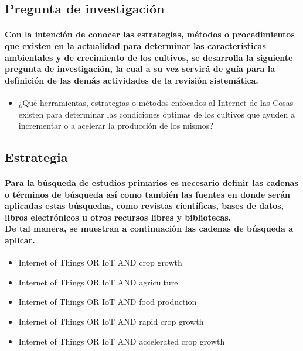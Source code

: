 \documentclass[10pt, twocolumn]{article}
\begin{document}
\subsection{Pregunta de investigación}
\paragraph{Con la intención de conocer las estrategias, métodos o procedimientos que existen en la actualidad para determinar las características ambientales y de crecimiento de los cultivos, se desarrolla la siguiente pregunta de investigación, la cual a su vez servirá de guía para la definición de las demás actividades de la revisión sistemática.}
\begin{itemize}
	\item{¿Qué herramientas, estrategias o métodos enfocados al Internet de las Cosas existen para determinar las condiciones óptimas de los cultivos que ayuden a incrementar o a acelerar la producción de los mismos?}
\end{itemize}

\subsection{Estrategia}
\paragraph{Para la búsqueda de estudios primarios es necesario definir las cadenas o términos de búsqueda así como también las fuentes en donde serán aplicadas estas búsquedas, como revistas científicas, bases de datos, libros electrónicos u otros recursos libres y bibliotecas. \\ De tal manera, se muestran a continuación las cadenas de búsqueda a aplicar.}
\begin{itemize}
	\item{Internet of Things OR IoT AND crop growth}
	\item{Internet of Things OR IoT AND agriculture}
	\item{Internet of Things OR IoT AND food production}
	\item{Internet of Things OR IoT AND rapid crop growth}
	\item{Internet of Things OR IoT AND accelerated crop growth}
\end{itemize}
\end{document}
